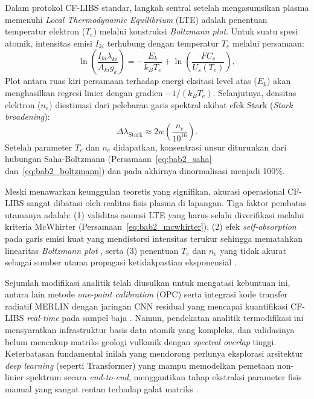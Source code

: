 Dalam protokol CF-LIBS standar, langkah sentral setelah mengasumsikan plasma memenuhi \textit{Local Thermodynamic Equilibrium} (LTE) adalah penentuan temperatur elektron ($T_e$) melalui konstruksi \textit{Boltzmann plot}. Untuk suatu spesi atomik, intensitas emisi $I_{ki}$ terhubung dengan temperatur $T_e$ melalui persamaan:
\begin{equation}
    \ln \left( \frac{I_{ki} \lambda_{ki}}{A_{ki} g_k} \right) = -\frac{E_k}{k_B T_e} + \ln \left( \frac{F C_s}{U_s(T_e)} \right), \label{eq:boltzmann_plot}
\end{equation}
Plot antara ruas kiri persamaan terhadap energi eksitasi level atas ($E_k$) akan menghasilkan regresi linier dengan gradien $-1/(k_B T_e)$. Selanjutnya, densitas elektron ($n_e$) diestimasi dari pelebaran garis spektral akibat efek Stark (\textit{Stark broadening}):
\begin{equation}
    \Delta \lambda_{\text{Stark}} \approx 2w \left( \frac{n_e}{10^{16}} \right).
\end{equation}
Setelah parameter $T_e$ dan $n_e$ didapatkan, konsentrasi unsur diturunkan dari hubungan Saha-Boltzmann (Persamaan~\ref{eq:bab2_saha} dan~\ref{eq:bab2_boltzmann}) dan pada akhirnya dinormalisasi menjadi 100\%.

Meski menawarkan keunggulan teoretis yang signifikan, akurasi operasional CF-LIBS sangat dibatasi oleh realitas fisis plasma di lapangan. Tiga faktor pembatas utamanya adalah: (1) validitas asumsi LTE yang harus selalu diverifikasi melalui kriteria McWhirter (Persamaan~\ref{eq:bab2_mcwhirter}), (2) efek \textit{self-absorption} pada garis emisi kuat yang mendistorsi intensitas terukur sehingga mematahkan linearitas \textit{Boltzmann plot} \citep{yang_self-absorption_2020}, serta (3) penentuan $T_e$ dan $n_e$ yang tidak akurat sebagai sumber utama propagasi ketidakpastian eksponensial \citep{zeng_accurate_2023}. 

Sejumlah modifikasi analitik telah diusulkan untuk mengatasi kebuntuan ini, antara lain metode \textit{one-point calibration} (OPC) \citep{borduchi_one-point_2019} serta integrasi kode transfer radiatif MERLIN dengan jaringan CNN residual yang mencapai kuantifikasi CF-LIBS \textit{real-time} pada sampel baja \citep{favre_towards_2025}. Namun, pendekatan analitik termodifikasi ini mensyaratkan infrastruktur basis data atomik yang kompleks, dan validasinya belum mencakup matriks geologi vulkanik dengan \textit{spectral overlap} tinggi. Keterbatasan fundamental inilah yang mendorong perlunya eksplorasi arsitektur \textit{deep learning} (seperti Transformer) yang mampu memodelkan pemetaan non-linier spektrum secara \textit{end-to-end}, menggantikan tahap ekstraksi parameter fisis manual yang sangat rentan terhadap galat matriks \citep{liu_remote_2026, walidain_informer-based_2026}.

